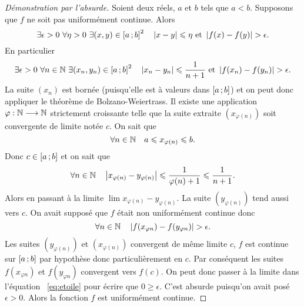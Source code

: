 \begin{proof}[Démonstration par l'absurde]
  Soient deux réels, \(a\) et \(b\) tels que \(a<b\). Supposons que \(f\) ne 
  soit pas uniformément continue. Alors
  \begin{equation}
    \exists \epsilon > 0 \ \forall \eta > 0 \ \exists (x,y) \in 
    \intervalleff{a}{b}^2 \quad \abs{x-y} \leqslant \eta \text{~et~} 
    \abs{f(x)-f(y)} > \epsilon.
  \end{equation}
  En particulier
  \begin{equation}
    \exists \epsilon > 0 \ \forall n \in \N \ \exists (x_n,y_n) \in 
    \intervalleff{a}{b}^2 \quad \abs{x_n-y_n} \leqslant \frac{1}{n+1} 
    \text{~et~} \abs{f(x_n)-f(y_n)} > \epsilon.
  \end{equation}
  La suite \((x_n)\) est bornée (puisqu'elle est à valeurs dans 
  \(\left[ a \, ;  b \right]\)) et on peut donc appliquer le théorème de 
  Bolzano-Weiertrass. Il existe une application \(\varphi : \mathbb{N} \longrightarrow 
  \mathbb{N}\) strictement croissante telle que la suite extraite \((x_{\varphi(n)})\) 
  soit convergente de limite notée \(c\). On sait que
  \begin{equation}
    \forall n \in \mathbb{N} \quad a \leqslant x_{\varphi(n)} \leqslant b.
  \end{equation}
  Donc \(c \in \left[ a \, ;  b \right]\) et on sait que
  \begin{equation}
    \forall n \in \mathbb{N} \quad \left\lvert x_{\varphi(n)}-y_{\varphi(n)}\right\rvert \leqslant 
    \frac{1}{\varphi(n)+1} \leqslant \frac{1}{n+1}.
  \end{equation}
  Alors en passant à la limite \(\lim x_{\varphi(n)}-y_{\varphi(n)}\). La suite 
  \((y_{\varphi(n)})\) tend aussi vers \(c\). On avait supposé que \(f\) était 
  non uniformément continue donc
  \begin{equation}\label{eq:etoile}
    \forall n \in \mathbb{N} \quad \left\lvert f(x_{\varphi{n}})-f(y_{\varphi{n}})\right\rvert > \epsilon.
  \end{equation}
  Les suites \((y_{\varphi(n)})\) et \((x_{\varphi(n)})\) convergent de même 
  limite \(c\), \(f\) est continue sur \(\left[ a \, ;  b \right]\) par hypothèse 
  donc particulièrement en \(c\). Par conséquent les suites 
  \(f(x_{\varphi{n}})\) et \(f(y_{\varphi{n}})\) convergent vers \(f(c)\). On 
  peut donc passer à la limite dans l'équation~
  \ref{eq:etoile} pour écrire que \(0 \geqslant \epsilon\). C'est absurde 
  puisqu'on avait posé \(\epsilon >0\). Alors la fonction \(f\) est uniformément 
  continue.
\end{proof}
